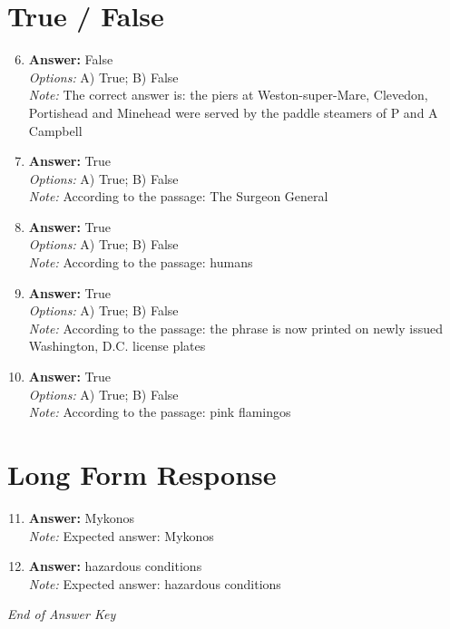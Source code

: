 \documentclass[12pt]{article}
\begin{document}
\section*{True / False}
\begin{enumerate}[label=\arabic*.]
\setcounter{enumi}{5}
\item \textbf{Answer:} False
\\ \textit{Options:} A) True; B) False
\\ \textit{Note:} The correct answer is: the piers at Weston-super-Mare, Clevedon, Portishead and Minehead were served by the paddle steamers of P and A Campbell
\item \textbf{Answer:} True
\\ \textit{Options:} A) True; B) False
\\ \textit{Note:} According to the passage: The Surgeon General
\item \textbf{Answer:} True
\\ \textit{Options:} A) True; B) False
\\ \textit{Note:} According to the passage: humans
\item \textbf{Answer:} True
\\ \textit{Options:} A) True; B) False
\\ \textit{Note:} According to the passage: the phrase is now printed on newly issued Washington, D.C. license plates
\item \textbf{Answer:} True
\\ \textit{Options:} A) True; B) False
\\ \textit{Note:} According to the passage: pink flamingos
\end{enumerate}

\section*{Long Form Response}
\begin{enumerate}[label=\arabic*.]
\setcounter{enumi}{10}
\item \textbf{Answer:} Mykonos
\\ \textit{Note:} Expected answer: Mykonos
\item \textbf{Answer:} hazardous conditions
\\ \textit{Note:} Expected answer: hazardous conditions
\end{enumerate}

\vfill
\noindent\textit{End of Answer Key}
\end{document}

